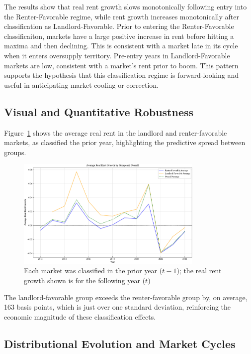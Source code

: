 \documentclass[APA,Times1COL]{WileyNJDv5} %
\begin{document}
The results show that real rent growth slows monotonically following entry into the Renter-Favorable regime, while rent growth increases monotonically after classification as Landlord-Favorable. Prior to entering the Renter-Favorable classificaiton, markets have a large positive increase in rent before hitting a maxima and then declining. This is consistent with a market late in its cycle when it enters oversupply territory. Pre-entry years in Landlord-Favorable markets are low, consistent with a market's rent prior to boom. This pattern supports the hypothesis that this classification regime is forward-looking and useful in anticipating market cooling or correction.

\subsection{Visual and Quantitative Robustness}



Figure~\ref{fig:group_averages_over_time} shows the average real rent in the landlord and renter-favorable markets, as classified the prior year, highlighting the predictive spread between groups.

\begin{figure}[h]
	\centering
	\includegraphics[width=0.8\textwidth]{group_averages_over_time.pdf}
	\caption{Each market was classified in the prior year ($t-1$); the real rent growth shown is for the following year ($t$)}
	\label{fig:group_averages_over_time}
\end{figure}


The landlord-favorable group exceeds the renter-favorable group by, on average, 163 basis points, which is just over one standard deviation, reinforcing the economic magnitude of these classification effects.

\subsection{Distributional Evolution and Market Cycles}
\end{document}

